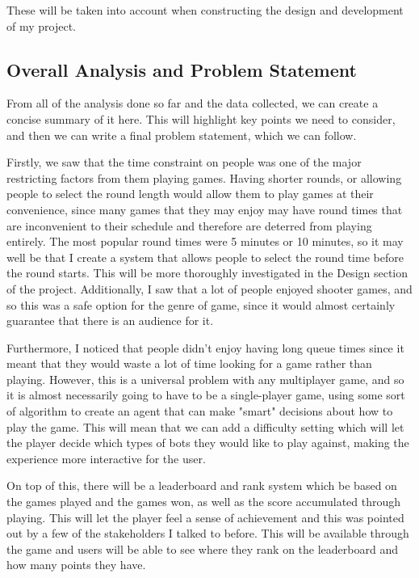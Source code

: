 These will be taken into account when constructing the design and development of my project.

\subsection{Overall Analysis and Problem Statement}

From all of the analysis done so far and the data collected, we can create a concise summary of it here. This will highlight key points we need to consider, and then we can write a final problem statement, which we can follow.

\vs
Firstly, we saw that the time constraint on people was one of the major restricting factors from them playing games. Having shorter rounds, or allowing people to select the round length would allow them to play games at their convenience, since many games that they may enjoy may have round times that are inconvenient to their schedule and therefore are deterred from playing entirely. The most popular round times were 5 minutes or 10 minutes, so it may well be that I create a system that allows people to select the round time before the round starts. This will be more thoroughly investigated in the Design section of the project. Additionally, I saw that a lot of people enjoyed shooter games, and so this was a safe option for the genre of game, since it would almost certainly guarantee that there is an audience for it.

\vs
Furthermore, I noticed that people didn't enjoy having long queue times since it meant that they would waste a lot of time looking for a game rather than playing. However, this is a universal problem with any multiplayer game, and so it is almost necessarily going to have to be a single-player game, using some sort of algorithm to create an agent that can make "smart" decisions about how to play the game. This will mean that we can add a difficulty setting which will let the player decide which types of bots they would like to play against, making the experience more interactive for the user.

\vs
On top of this, there will be a leaderboard and rank system which be based on the games played and the games won, as well as the score accumulated through playing. This will let the player feel a sense of achievement and this was pointed out by a few of the stakeholders I talked to before. This will be available through the game and users will be able to see where they rank on the leaderboard and how many points they have.

